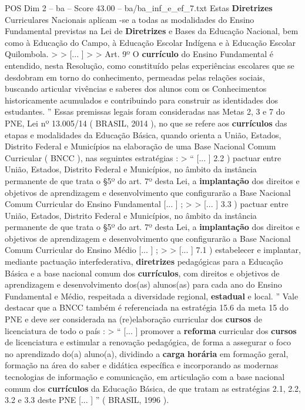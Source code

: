 \begin{textsample}{POS Dim 2 – ba – Score 43.00 – ba/ba\_inf\_e\_ef\_7.txt}
Estas \textbf{Diretrizes} Curriculares Nacionais aplicam -se a todas as modalidades do Ensino Fundamental previstas na Lei de \textbf{Diretrizes} e Bases da Educação Nacional, bem como à Educação do Campo, à Educação Escolar Indígena e à Educação Escolar Quilombola. > > [... ] > > Art. 9º O \textbf{currículo} do Ensino Fundamental é entendido, nesta Resolução, como constituído pelas experiências escolares que se desdobram em torno do conhecimento, permeadas pelas relações sociais, buscando articular vivências e saberes dos alunos com os Conhecimentos historicamente acumulados e contribuindo para construir as identidades dos estudantes. ” Essas premissas legais foram consideradas nas Metas 2, 3 e 7 do PNE, Lei nº 13.005/14 ( BRASIL, 2014 ), no que se refere aos \textbf{currículos} das etapas e modalidades da Educação Básica, quando orienta a União, Estados, Distrito Federal e Municípios na elaboração de uma Base Nacional Comum Curricular ( BNCC ), nas seguintes estratégias : > “ [... ] 2.2 ) pactuar entre União, Estados, Distrito Federal e Municípios, no âmbito da instância permanente de que trata o §5º do art. 7º desta Lei, a \textbf{implantação} dos direitos e objetivos de aprendizagem e desenvolvimento que configurarão a Base Nacional Comum Curricular do Ensino Fundamental [... ] ; > > [... ] 3.3 ) pactuar entre União, Estados, Distrito Federal e Municípios, no âmbito da instância permanente de que trata o §5º do art. 7º desta Lei, a \textbf{implantação} dos direitos e objetivos de aprendizagem e desenvolvimento que configurarão a Base Nacional Comum Curricular do Ensino Médio [... ] ; > > [... ] 7.1 ) estabelecer e implantar, mediante pactuação interfederativa, \textbf{diretrizes} pedagógicas para a Educação Básica e a base nacional comum dos \textbf{currículos}, com direitos e objetivos de aprendizagem e desenvolvimento dos(as) alunos(as) para cada ano do Ensino Fundamental e Médio, respeitada a diversidade regional, \textbf{estadual} e local. ” Vale destacar que a BNCC também é referenciada na estratégia 15.6 da meta 15 do PNE e deve ser considerada na (re)elaboração curricular dos \textbf{cursos} de licenciatura de todo o país : > “ [... ] promover a \textbf{reforma} curricular dos \textbf{cursos} de licenciatura e estimular a renovação pedagógica, de forma a assegurar o foco no aprendizado do(a) aluno(a), dividindo a \textbf{carga} \textbf{horária} em formação geral, formação na área do saber e didática específica e incorporando as modernas tecnologias de informação e comunicação, em articulação com a base nacional comum dos \textbf{currículos} da Educação Básica, de que tratam as estratégias 2.1, 2.2, 3.2 e 3.3 deste PNE [... ] ” ( BRASIL, 1996 ).

\end{textsample}
